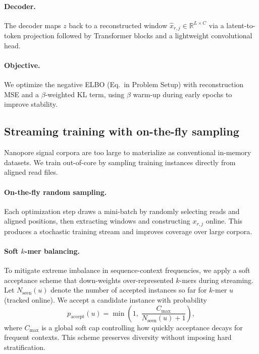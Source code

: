 \documentclass[journal,article,submit,pdftex,moreauthors]{Definitions/mdpi}
\begin{document}
\paragraph{Decoder.}
The decoder maps $z$ back to a reconstructed window $\hat{x}_{r,j}\in\mathbb{R}^{L\times C}$ via a
latent-to-token projection followed by Transformer blocks and a lightweight convolutional head.

\paragraph{Objective.}
We optimize the negative ELBO (Eq.\ in Problem Setup) with reconstruction MSE and a $\beta$-weighted
KL term, using $\beta$ warm-up during early epochs to improve stability.

\subsection{Streaming training with on-the-fly sampling}
Nanopore signal corpora are too large to materialize as conventional in-memory datasets. We train
out-of-core by sampling training instances directly from aligned read files.

\paragraph{On-the-fly random sampling.}
Each optimization step draws a mini-batch by randomly selecting reads and aligned positions, then
extracting windows and constructing $x_{r,j}$ online. This produces a stochastic training stream and
improves coverage over large corpora.

\paragraph{Soft $k$-mer balancing.}
To mitigate extreme imbalance in sequence-context frequencies, we apply a soft acceptance scheme
that down-weights over-represented $k$-mers during streaming. Let $N_{\text{seen}}(u)$ denote the
number of accepted instances so far for $k$-mer $u$ (tracked online). We accept a candidate instance
with probability
\begin{equation}
p_{\text{accept}}(u) = \min\!\left(1,\; \frac{C_{\max}}{N_{\text{seen}}(u)+1}\right),
\end{equation}
where $C_{\max}$ is a global soft cap controlling how quickly acceptance decays for frequent contexts.
This scheme preserves diversity without imposing hard stratification.
\end{document}
